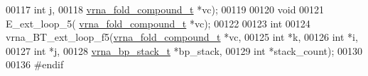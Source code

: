 \begin{DoxyCode}
00117             \textcolor{keywordtype}{int} j,
00118             \hyperlink{group__fold__compound_structvrna__fc__s}{vrna\_fold\_compound\_t} *vc);
00119 
00120 \textcolor{keywordtype}{void}
00121 E\_ext\_loop\_5( \hyperlink{group__fold__compound_structvrna__fc__s}{vrna\_fold\_compound\_t} *vc);
00122 
00123 \textcolor{keywordtype}{int}
00124 vrna\_BT\_ext\_loop\_f5(\hyperlink{group__fold__compound_structvrna__fc__s}{vrna\_fold\_compound\_t} *vc,
00125                     \textcolor{keywordtype}{int} *k,
00126                     \textcolor{keywordtype}{int} *i,
00127                     \textcolor{keywordtype}{int} *j,
00128                     \hyperlink{group__data__structures_structvrna__bp__stack__s}{vrna\_bp\_stack\_t} *bp\_stack,
00129                     \textcolor{keywordtype}{int} *stack\_count);
00130 
00136 \textcolor{preprocessor}{#endif}
\end{DoxyCode}
